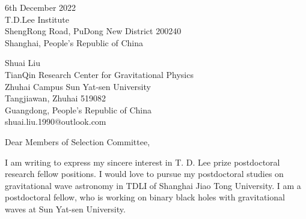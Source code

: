 \documentclass[11pt,a4paper,sans]{letter} %
\date{}
\begin{document}

\begin{letter}{6th December 2022 \\
T.D.Lee Institute\\
ShengRong Road, PuDong New District 200240\\ 
Shanghai, People's Republic of China}

Shuai Liu \\
TianQin Research Center for Gravitational Physics \\
Zhuhai Campus Sun Yat-sen University \\
Tangjiawan, Zhuhai 519082 \\
Guangdong, People's Republic of China \\
shuai.liu.1990@outlook.com








\opening{Dear Members of Selection Committee,} 
 
    I am writing to express my sincere interest in T. D. Lee prize postdoctoral research fellow positions. I would love to
pursue my postdoctoral studies on gravitational wave astronomy in TDLI of Shanghai Jiao Tong University. I am a postdoctoral fellow, who is working on 
    binary black holes with gravitational waves at Sun Yat-sen University.


\end{letter}
\end{document}
